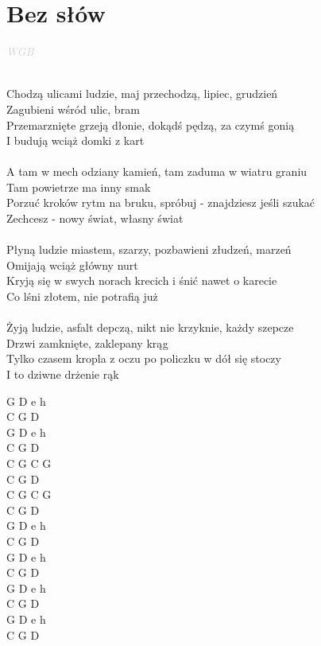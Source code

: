 \documentclass[a5paper, 10pt]{book}
\begin{document}
\section{Bez słów}\textcolor{lightgray}{\textit{WGB}}\\~\\
\begin{minipage}[t]{0.85\textwidth}
  Chodzą ulicami ludzie, maj przechodzą, lipiec, grudzień\\
  Zagubieni wśród ulic, bram\\
  Przemarznięte grzeją dłonie, dokądś pędzą, za czymś gonią\\
  I budują wciąż domki z kart\\
  \\
  \hspace*{5mm}A tam w mech odziany kamień, tam zaduma w wiatru graniu\\
  \hspace*{5mm}Tam powietrze ma inny smak\\
  \hspace*{5mm}Porzuć kroków rytm na bruku, spróbuj - znajdziesz jeśli szukać\\
  \hspace*{5mm}Zechcesz - nowy świat, własny świat\\
  \\
  Płyną ludzie miastem, szarzy, pozbawieni złudzeń, marzeń\\
  Omijają wciąż główny nurt\\
  Kryją się w swych norach krecich i śnić nawet o karecie\\
  Co lśni złotem, nie potrafią już\\
  \\
  Żyją ludzie, asfalt depczą, nikt nie krzyknie, każdy szepcze\\
  Drzwi zamknięte, zaklepany krąg\\
  Tylko czasem kropla z oczu po policzku w dół się stoczy\\
  I to dziwne drżenie rąk\\
\end{minipage}
\begin{minipage}[t]{0.2\textwidth}
  G D e h\\
  C G D\\
  G D e h\\
  C G D\\

  C G C G\\
  C G D\\
  C G C G\\
  C G D\\

  G D e h\\
  C G D\\
  G D e h\\
  C G D\\

  G D e h\\
  C G D\\
  G D e h\\
  C G D\\
\end{minipage}
\end{document}
